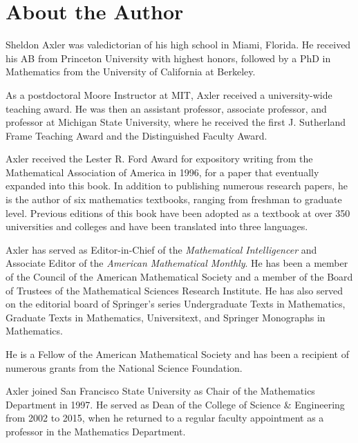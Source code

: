 
\setcounter{page}{4}

\chapter{About the Author}

Sheldon Axler was valedictorian of his high school in Miami, Florida. He received his AB from Princeton University with highest honors, followed by a PhD in Mathematics from the University of California at Berkeley.

As a postdoctoral Moore Instructor at MIT, Axler received a university-wide teaching award. He was then an assistant professor, associate professor, and professor at Michigan State University, where he received the first J. Sutherland Frame Teaching Award and the Distinguished Faculty Award.

Axler received the Lester R. Ford Award for expository writing from the Mathematical Association of America in 1996, for a paper that eventually expanded into this book. In addition to publishing numerous research papers, he is the author of six mathematics textbooks, ranging from freshman to graduate level. Previous editions of this book have been adopted as a textbook at over 350 universities and colleges and have been translated into three languages.

Axler has served as Editor-in-Chief of the \textit{Mathematical Intelligencer} and Associate Editor of the \textit{American Mathematical Monthly}. He has been a member of the Council of the American Mathematical Society and a member of the Board of Trustees of the Mathematical Sciences Research Institute. He has also served on the editorial board of Springer's series Undergraduate Texts in Mathematics, Graduate Texts in Mathematics, Universitext, and Springer Monographs in Mathematics.

He is a Fellow of the American Mathematical Society and has been a recipient of numerous grants from the National Science Foundation.

Axler joined San Francisco State University as Chair of the Mathematics Department in 1997. He served as Dean of the College of Science \& Engineering from 2002 to 2015, when he returned to a regular faculty appointment as a professor in the Mathematics Department.

\bigskip

 \label{SheldonBengal}

